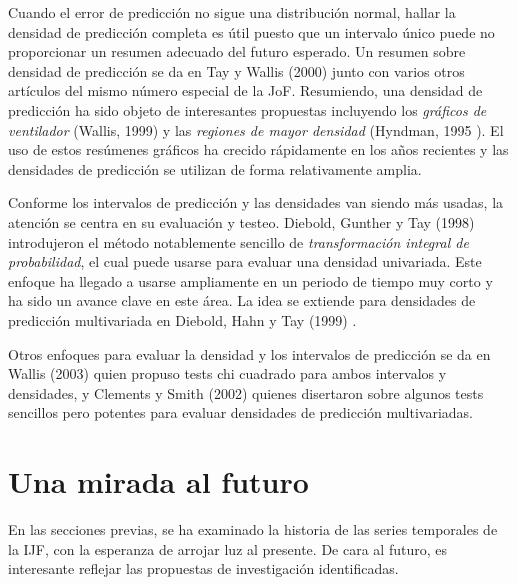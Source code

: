 \documentclass{llncs}
\begin{document}
Cuando el error de predicción no sigue una distribución normal, hallar la densidad de predicción completa es útil puesto que un intervalo único puede no proporcionar un resumen adecuado del futuro esperado. Un resumen sobre densidad de predicción se da en Tay y Wallis (2000) \cite{Tay2000235} junto con varios otros artículos del mismo número especial de la JoF. Resumiendo, una densidad de predicción ha sido objeto de interesantes propuestas incluyendo los \emph{gráficos de ventilador}  (Wallis, 1999) \cite{Wallis1999106} y las \emph{regiones de mayor densidad} (Hyndman, 1995 \cite{Hyndman1995431}). El uso de estos resúmenes gráficos ha crecido rápidamente en los años recientes y las densidades de predicción se utilizan de forma relativamente amplia.

Conforme los intervalos de predicción y las densidades van siendo más usadas, la atención se centra en su evaluación y testeo. Diebold, Gunther y Tay (1998) \cite{Diebold1998863} introdujeron el método notablemente sencillo de \emph{transformación integral de probabilidad}, el cual puede usarse para evaluar una densidad univariada. Este enfoque ha llegado a usarse ampliamente en un periodo de tiempo muy corto y ha sido un avance clave en este área. La idea se extiende para densidades de predicción multivariada en Diebold, Hahn y Tay (1999) \cite{Diebold1999661}.

Otros enfoques para evaluar la densidad y los intervalos de predicción se da en Wallis (2003) \cite{Wallis2003165} quien propuso tests chi cuadrado para ambos intervalos y densidades, y Clements y Smith (2002) quienes disertaron sobre algunos tests sencillos pero potentes para evaluar densidades de predicción multivariadas.

\section{Una mirada al futuro}
En las secciones previas, se ha examinado la historia de las series temporales de la IJF, con la esperanza de arrojar luz al presente. De cara al futuro, es interesante reflejar las propuestas de investigación identificadas. 
\end{document}
